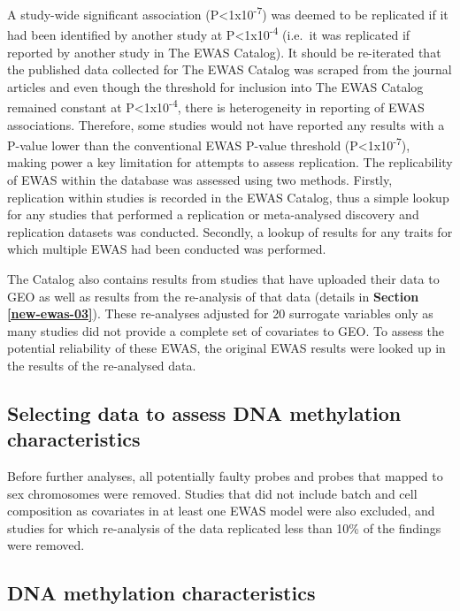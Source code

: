 \documentclass[11pt,twoside]{bristolthesis}
\begin{document}
A study-wide significant association (P\textless1x10\textsuperscript{-7}) was deemed to be replicated if it had been identified by another study at P\textless1x10\textsuperscript{-4} (i.e.~it was replicated if reported by another study in The EWAS Catalog). It should be re-iterated that the published data collected for The EWAS Catalog was scraped from the journal articles and even though the threshold for inclusion into The EWAS Catalog remained constant at P\textless1x10\textsuperscript{-4}, there is heterogeneity in reporting of EWAS associations. Therefore, some studies would not have reported any results with a P-value lower than the conventional EWAS P-value threshold (P\textless1x10\textsuperscript{-7}), making power a key limitation for attempts to assess replication. The replicability of EWAS within the database was assessed using two methods. Firstly, replication within studies is recorded in the EWAS Catalog, thus a simple lookup for any studies that performed a replication or meta-analysed discovery and replication datasets was conducted. Secondly, a lookup of results for any traits for which multiple EWAS had been conducted was performed.

The Catalog also contains results from studies that have uploaded their data to GEO as well as results from the re-analysis of that data (details in \textbf{Section \ref{new-ewas-03}}). These re-analyses adjusted for 20 surrogate variables only as many studies did not provide a complete set of covariates to GEO. To assess the potential reliability of these EWAS, the original EWAS results were looked up in the results of the re-analysed data.

\hypertarget{selecting-data-to-assess-dna-methylation-characteristics}{%
\subsection{Selecting data to assess DNA methylation characteristics}\label{selecting-data-to-assess-dna-methylation-characteristics}}

Before further analyses, all potentially faulty probes and probes that mapped to sex chromosomes were removed. Studies that did not include batch and cell composition as covariates in at least one EWAS model were also excluded, and studies for which re-analysis of the data replicated less than 10\% of the findings were removed.

\hypertarget{dna-methylation-characteristics}{%
\subsection{DNA methylation characteristics}\label{dna-methylation-characteristics}}
\end{document}

